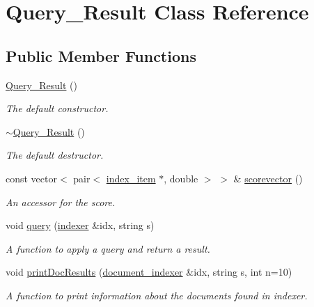 \hypertarget{class_query___result}{}\section{Query\+\_\+\+Result Class Reference}
\label{class_query___result}
\subsection*{Public Member Functions}
\begin{DoxyCompactItemize}
\item 
\hyperlink{class_query___result_aca6caea4d2be58145212fc22c56a5fab}{Query\+\_\+\+Result} ()
\begin{DoxyCompactList}\small\item\em The default constructor. \end{DoxyCompactList}\item 
\mbox{\label{class_query___result_a12b2802d889af86623d0b1b646ca6854}} 
\hyperlink{class_query___result_a12b2802d889af86623d0b1b646ca6854}{$\sim$\+Query\+\_\+\+Result} ()
\begin{DoxyCompactList}\small\item\em The default destructor. \end{DoxyCompactList}\item 
const vector$<$ pair$<$ \hyperlink{classindex__item}{index\+\_\+item} $\ast$, double $>$ $>$ \& \hyperlink{class_query___result_a4ef5504013529a3b61b1d064ad75b348}{scorevector} ()
\begin{DoxyCompactList}\small\item\em An accessor for the score. \end{DoxyCompactList}\item 
void \hyperlink{class_query___result_a444ded4e65dab7222256ed6591ff78d9}{query} (\hyperlink{classindexer}{indexer} \&idx, string s)
\begin{DoxyCompactList}\small\item\em A function to apply a query and return a result. \end{DoxyCompactList}\item 
void \hyperlink{class_query___result_a5a3054d05f8768e724886d3cae6970c1}{print\+Doc\+Results} (\hyperlink{classdocument__indexer}{document\+\_\+indexer} \&idx, string s, int n=10)
\begin{DoxyCompactList}\small\item\em A function to print information about the documents found in indexer. \end{DoxyCompactList}\item 

\end{DoxyCompactItemize}

